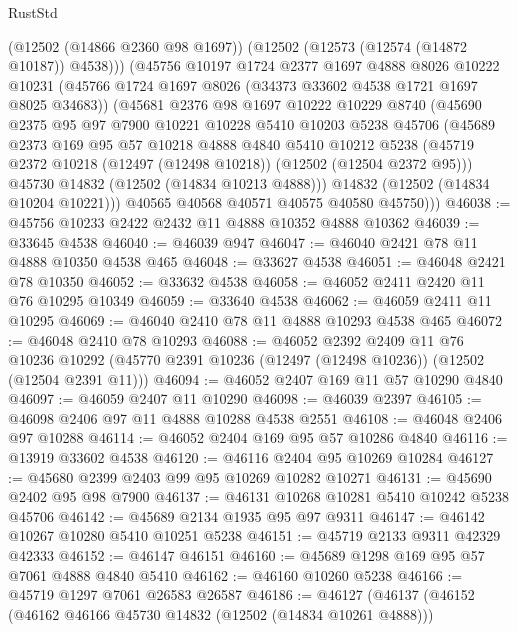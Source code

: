 \begin{lexlean}{RustStd}
\begin{coremodule}
        (@12502 (@14866 @2360 @98 @1697))
        (@12502 (@12573 (@12574 (@14872 @10187)) @4538)))
      (@45756
        @10197
        @1724
        @2377
        @1697
        @4888
        @8026
        @10222
        @10231
        (@45766 @1724 @1697 @8026 (@34373 @33602 @4538 @1721 @1697 @8025 @34683))
        (@45681
          @2376
          @98
          @1697
          @10222
          @10229
          @8740
          (@45690
            @2375
            @95
            @97
            @7900
            @10221
            @10228
            @5410
            @10203
            @5238
            @45706
            (@45689
              @2373
              @169
              @95
              @57
              @10218
              @4888
              @4840
              @5410
              @10212
              @5238
              (@45719 @2372 @10218 (@12497 (@12498 @10218)) (@12502 (@12504 @2372 @95)))
              @45730
              @14832
              (@12502 (@14834 @10213 @4888)))
            @14832
            (@12502 (@14834 @10204 @10221)))
          @40565
          @40568
          @40571
          @40575
          @40580
          @45750)))
@46038 := @45756 @10233 @2422 @2432 @11 @4888 @10352 @4888 @10362
@46039 := @33645 @4538
@46040 := @46039 @947
@46047 := @46040 @2421 @78 @11 @4888 @10350 @4538 @465
@46048 := @33627 @4538
@46051 := @46048 @2421 @78 @10350
@46052 := @33632 @4538
@46058 := @46052 @2411 @2420 @11 @76 @10295 @10349
@46059 := @33640 @4538
@46062 := @46059 @2411 @11 @10295
@46069 := @46040 @2410 @78 @11 @4888 @10293 @4538 @465
@46072 := @46048 @2410 @78 @10293
@46088 := @46052
    @2392
    @2409
    @11
    @76
    @10236
    @10292
    (@45770 @2391 @10236 (@12497 (@12498 @10236)) (@12502 (@12504 @2391 @11)))
@46094 := @46052 @2407 @169 @11 @57 @10290 @4840
@46097 := @46059 @2407 @11 @10290
@46098 := @46039 @2397
@46105 := @46098 @2406 @97 @11 @4888 @10288 @4538 @2551
@46108 := @46048 @2406 @97 @10288
@46114 := @46052 @2404 @169 @95 @57 @10286 @4840
@46116 := @13919 @33602 @4538
@46120 := @46116 @2404 @95 @10269 @10284
@46127 := @45680 @2399 @2403 @99 @95 @10269 @10282 @10271
@46131 := @45690 @2402 @95 @98 @7900
@46137 := @46131 @10268 @10281 @5410 @10242 @5238 @45706
@46142 := @45689 @2134 @1935 @95 @97 @9311
@46147 := @46142 @10267 @10280 @5410 @10251 @5238
@46151 := @45719 @2133 @9311 @42329 @42333
@46152 := @46147 @46151
@46160 := @45689 @1298 @169 @95 @57 @7061 @4888 @4840 @5410
@46162 := @46160 @10260 @5238
@46166 := @45719 @1297 @7061 @26583 @26587
@46186 := @46127
    (@46137
      (@46152
        (@46162 @46166 @45730 @14832 (@12502 (@14834 @10261 @4888)))

\end{coremodule}
\end{lexlean}
